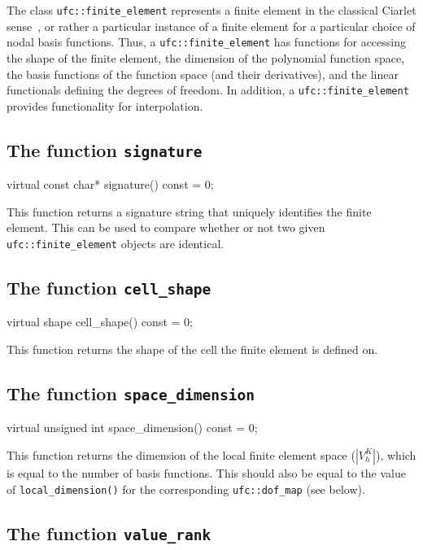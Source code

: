The class \texttt{ufc::finite\_element} represents a finite element in
the classical Ciarlet sense~\cite{Cia78}, or rather a particular
instance of a finite element for a particular choice of nodal basis
functions. Thus, a \texttt{ufc::finite\_element} has functions for
accessing the shape of the finite element, the dimension of the
polynomial function space, the basis functions of the function space
(and their derivatives), and the linear functionals defining the
degrees of freedom. In addition, a \texttt{ufc::finite\_element}
provides functionality for interpolation.

\subsection{The function \texttt{signature}}

\begin{code}
virtual const char* signature() const = 0;
\end{code}

This function returns a signature string that uniquely identifies the
finite element. This can be used to compare whether or not two given
\texttt{ufc::fi\-nite\_element} objects are identical.

\subsection{The function \texttt{cell\_shape}}

\begin{code}
virtual shape cell_shape() const = 0;
\end{code}

This function returns the shape of the cell the finite element is
defined on.

\subsection{The function \texttt{space\_dimension}}

\begin{code}
virtual unsigned int space_dimension() const = 0;
\end{code}

This function returns the dimension of the local finite element space
($|V_h^K|$), which is equal to the number of basis functions. This
should also be equal to the value of \texttt{local\_dimension()} for
the corresponding \texttt{ufc::dof\_map} (see below).

\subsection{The function \texttt{value\_rank}}

